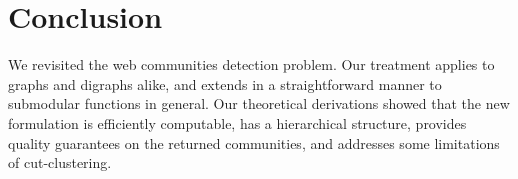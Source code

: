 \section{Conclusion}

We revisited the web communities detection problem. Our treatment applies to graphs and digraphs
alike, and extends in a straightforward manner to submodular functions in general. Our theoretical
derivations showed that the new formulation is efficiently computable, has a hierarchical  
structure, provides quality guarantees on the returned communities, and addresses some limitations 
of cut-clustering.

